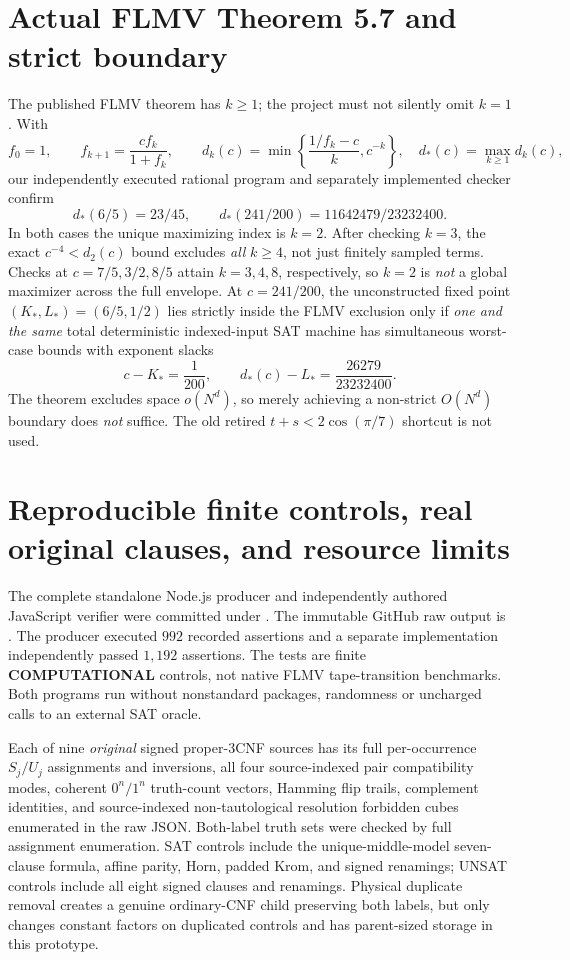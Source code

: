 \documentclass[11pt]{article}
\begin{document}
\section*{Actual FLMV Theorem 5.7 and strict boundary}
The published FLMV theorem has $k\ge1$; the project must not silently omit $k=1$. With
\[
f_0=1,\qquad f_{k+1}=\frac{cf_k}{1+f_k},\qquad
d_k(c)=\min\left\{\frac{1/f_k-c}{k},c^{-k}\right\},
\quad d_*(c)=\max_{k\ge1}d_k(c),
\]
our independently executed rational program and separately implemented checker confirm
\[
d_*(6/5)=23/45,\qquad
d_*(241/200)=11642479/23232400.
\]
In both cases the unique maximizing index is $k=2$. After checking $k=3$, the exact $c^{-4}<d_2(c)$ bound excludes \emph{all} $k\ge4$, not just finitely sampled terms. Checks at $c=7/5,3/2,8/5$ attain $k=3,4,8$, respectively, so $k=2$ is \emph{not} a global maximizer across the full envelope. At $c=241/200$, the unconstructed fixed point $(K_*,L_*)=(6/5,1/2)$ lies strictly inside the FLMV exclusion only if \emph{one and the same} total deterministic indexed-input SAT machine has simultaneous worst-case bounds with exponent slacks
\[
c-K_*=\frac1{200},\qquad
d_*(c)-L_*=\frac{26279}{23232400}.
\]
The theorem excludes space $o(N^{d})$, so merely achieving a non-strict $O(N^{d})$ boundary does \emph{not} suffice. The old retired $t+s<2\cos(\pi/7)$ shortcut is not used.

\section*{Reproducible finite controls, real original clauses, and resource limits}
The complete standalone Node.js producer and independently authored JavaScript verifier were committed under . The immutable GitHub raw output is . The producer executed $992$ recorded assertions and a separate implementation independently passed $1,192$ assertions. The tests are finite \textbf{COMPUTATIONAL} controls, not native FLMV tape-transition benchmarks. Both programs run without nonstandard packages, randomness or uncharged calls to an external SAT oracle.

Each of nine \emph{original} signed proper-3CNF sources has its full per-occurrence $S_j/U_j$ assignments and inversions, all four source-indexed pair compatibility modes, coherent $0^n/1^n$ truth-count vectors, Hamming flip trails, complement identities, and source-indexed non-tautological resolution forbidden cubes enumerated in the raw JSON. Both-label truth sets were checked by full assignment enumeration. SAT controls include the unique-middle-model seven-clause formula, affine parity, Horn, padded Krom, and signed renamings; UNSAT controls include all eight signed clauses and renamings. Physical duplicate removal creates a genuine ordinary-CNF child preserving both labels, but only changes constant factors on duplicated controls and has parent-sized storage in this prototype.
\end{document}
